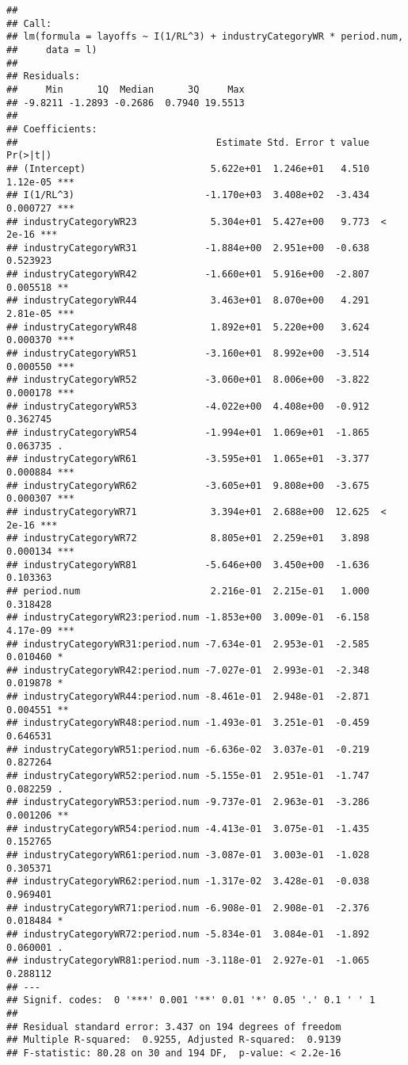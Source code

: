 \documentclass[
]{article}
\begin{document}
\begin{verbatim}
## 
## Call:
## lm(formula = layoffs ~ I(1/RL^3) + industryCategoryWR * period.num, 
##     data = l)
## 
## Residuals:
##     Min      1Q  Median      3Q     Max 
## -9.8211 -1.2893 -0.2686  0.7940 19.5513 
## 
## Coefficients:
##                                   Estimate Std. Error t value Pr(>|t|)    
## (Intercept)                      5.622e+01  1.246e+01   4.510 1.12e-05 ***
## I(1/RL^3)                       -1.170e+03  3.408e+02  -3.434 0.000727 ***
## industryCategoryWR23             5.304e+01  5.427e+00   9.773  < 2e-16 ***
## industryCategoryWR31            -1.884e+00  2.951e+00  -0.638 0.523923    
## industryCategoryWR42            -1.660e+01  5.916e+00  -2.807 0.005518 ** 
## industryCategoryWR44             3.463e+01  8.070e+00   4.291 2.81e-05 ***
## industryCategoryWR48             1.892e+01  5.220e+00   3.624 0.000370 ***
## industryCategoryWR51            -3.160e+01  8.992e+00  -3.514 0.000550 ***
## industryCategoryWR52            -3.060e+01  8.006e+00  -3.822 0.000178 ***
## industryCategoryWR53            -4.022e+00  4.408e+00  -0.912 0.362745    
## industryCategoryWR54            -1.994e+01  1.069e+01  -1.865 0.063735 .  
## industryCategoryWR61            -3.595e+01  1.065e+01  -3.377 0.000884 ***
## industryCategoryWR62            -3.605e+01  9.808e+00  -3.675 0.000307 ***
## industryCategoryWR71             3.394e+01  2.688e+00  12.625  < 2e-16 ***
## industryCategoryWR72             8.805e+01  2.259e+01   3.898 0.000134 ***
## industryCategoryWR81            -5.646e+00  3.450e+00  -1.636 0.103363    
## period.num                       2.216e-01  2.215e-01   1.000 0.318428    
## industryCategoryWR23:period.num -1.853e+00  3.009e-01  -6.158 4.17e-09 ***
## industryCategoryWR31:period.num -7.634e-01  2.953e-01  -2.585 0.010460 *  
## industryCategoryWR42:period.num -7.027e-01  2.993e-01  -2.348 0.019878 *  
## industryCategoryWR44:period.num -8.461e-01  2.948e-01  -2.871 0.004551 ** 
## industryCategoryWR48:period.num -1.493e-01  3.251e-01  -0.459 0.646531    
## industryCategoryWR51:period.num -6.636e-02  3.037e-01  -0.219 0.827264    
## industryCategoryWR52:period.num -5.155e-01  2.951e-01  -1.747 0.082259 .  
## industryCategoryWR53:period.num -9.737e-01  2.963e-01  -3.286 0.001206 ** 
## industryCategoryWR54:period.num -4.413e-01  3.075e-01  -1.435 0.152765    
## industryCategoryWR61:period.num -3.087e-01  3.003e-01  -1.028 0.305371    
## industryCategoryWR62:period.num -1.317e-02  3.428e-01  -0.038 0.969401    
## industryCategoryWR71:period.num -6.908e-01  2.908e-01  -2.376 0.018484 *  
## industryCategoryWR72:period.num -5.834e-01  3.084e-01  -1.892 0.060001 .  
## industryCategoryWR81:period.num -3.118e-01  2.927e-01  -1.065 0.288112    
## ---
## Signif. codes:  0 '***' 0.001 '**' 0.01 '*' 0.05 '.' 0.1 ' ' 1
## 
## Residual standard error: 3.437 on 194 degrees of freedom
## Multiple R-squared:  0.9255, Adjusted R-squared:  0.9139 
## F-statistic: 80.28 on 30 and 194 DF,  p-value: < 2.2e-16
\end{verbatim}
\end{document}
